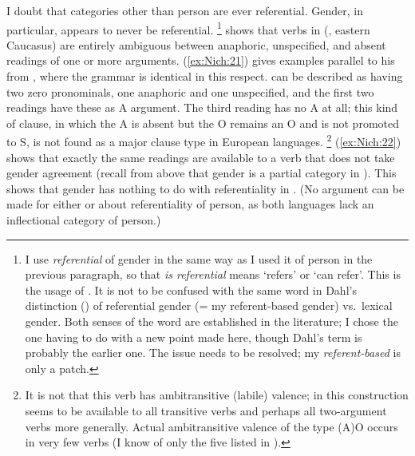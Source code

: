 \documentclass[output=collectionpaper]{langsci/langscibook}
\begin{document}
I doubt that categories other than person are ever referential.  Gender, in particular, appears to never be referential.%
\footnote{%
\label{fn:Nich:15}
I use \textit{referential} of gender in the same way as I used it of person in the previous paragraph, so that \textit{is referential} means `refers' or `can refer'.  This is the usage of \citet{Kibrik2011}.  It is not to be confused with the same word in Dahl's distinction (\citeyear{Dahl2000a}) of referential gender (= my referent-based gender) vs.\ lexical gender.  Both senses of the word are established in the literature; I chose the one having to do with a new point made here, though Dahl's term is probably the earlier one.  The issue needs to be resolved; my \textit{referent-based} is only a patch.
} %
\citet{Creissels2014b} shows that verbs in  (, eastern Caucasus) are entirely ambiguous between anaphoric, unspecified, and absent readings of one or more arguments. (\ref{ex:Nich:21}) gives examples parallel to his from , where the grammar is identical in this respect.  can be described as having two zero pronominals, one anaphoric and one unspecified, and the first two readings have these as A argument. The third reading has no A at all; this kind of clause, in which the A is absent but the O remains an O and is not promoted to S, is not found as a major clause type in European languages.%
\footnote{%
It is not that this verb has ambitransitive (labile) valence; in  this construction seems to be available to all transitive verbs and perhaps all two-argument verbs more generally. Actual ambitransitive valence of the type (A)O occurs in very few  verbs (I know of only the five listed in \citealt[466--467]{Nichols2011}).
} %
(\ref{ex:Nich:22}) shows that exactly the same readings are available to a verb that does not take gender agreement (recall from above that gender is a partial category in ).  This shows that gender has nothing to do with referentiality in . (No argument can be made for either  or  about referentiality of person, as both languages lack an inflectional category of person.)
\end{document}
